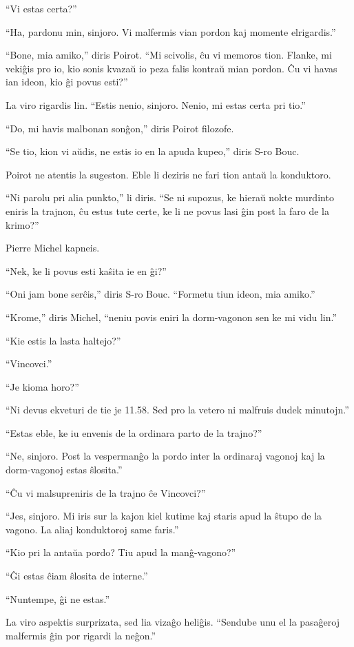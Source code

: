 ``Vi estas certa?''

``Ha, pardonu min, sinjoro. Vi malfermis vian pordon kaj momente elrigardis.''

``Bone, mia amiko,'' diris Poirot. ``Mi scivolis, ĉu vi memoros tion. Flanke, mi vekiĝis pro io, kio sonis kvazaŭ io peza falis kontraŭ mian pordon. Ĉu vi havas ian ideon, kio ĝi povus esti?''

La viro rigardis lin. ``Estis nenio, sinjoro. Nenio, mi estas certa pri tio.''

``Do, mi havis malbonan sonĝon,'' diris Poirot filozofe.

``Se tio, kion vi aŭdis, ne estis io en la apuda kupeo,'' diris S-ro Bouc.

Poirot ne atentis la sugeston. Eble li deziris ne fari tion antaŭ la konduktoro.

``Ni parolu pri alia punkto,'' li diris. ``Se ni supozus, ke hieraŭ nokte murdinto eniris la trajnon, ĉu estus tute certe, ke li ne povus lasi ĝin post la faro de la krimo?''

Pierre Michel kapneis.

``Nek, ke li povus esti kaŝita ie en ĝi?''

``Oni jam bone serĉis,'' diris S-ro Bouc. ``Formetu tiun ideon, mia amiko.''

``Krome,'' diris Michel, ``neniu povis eniri la dorm-vagonon sen ke mi vidu lin.''

``Kie estis la lasta haltejo?''

``Vincovci.''

``Je kioma horo?''

``Ni devus ekveturi de tie je 11.58. Sed pro la vetero ni malfruis dudek minutojn.''

``Estas eble, ke iu envenis de la ordinara parto de la trajno?''

``Ne, sinjoro. Post la vespermanĝo la pordo inter la ordinaraj vagonoj kaj la dorm-vagonoj estas ŝlosita.''

``Ĉu vi malsupreniris de la trajno ĉe Vincovci?''

``Jes, sinjoro. Mi iris sur la kajon kiel kutime kaj staris apud la ŝtupo de la vagono. La aliaj konduktoroj same faris.''

``Kio pri la antaŭa pordo? Tiu apud la manĝ-vagono?''

``Ĝi estas ĉiam ŝlosita de interne.''

``Nuntempe, ĝi ne estas.''

La viro aspektis surprizata, sed lia vizaĝo heliĝis. ``Sendube unu el la pasaĝeroj malfermis ĝin por rigardi la neĝon.''

